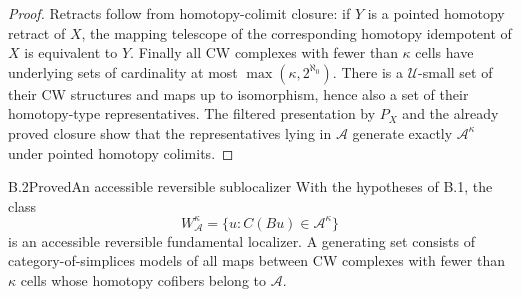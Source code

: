 \begin{proof}
Retracts follow from homotopy-colimit closure: if $Y$ is a pointed homotopy retract of $X$, the mapping telescope of the corresponding homotopy idempotent of $X$ is equivalent to $Y$. Finally all CW complexes with fewer than $\kappa$ cells have underlying sets of cardinality at most $\max(\kappa,2^{\aleph_0})$. There is a $\mathcal U$-small set of their CW structures and maps up to isomorphism, hence also a set of their homotopy-type representatives. The filtered presentation by $P_X$ and the already proved closure show that the representatives lying in $\mathcal A$ generate exactly $\mathcal A^\kappa$ under pointed homotopy colimits.
\end{proof}

\begin{claim}{B.2}{Proved}{An accessible reversible sublocalizer}\label{B2}
With the hypotheses of B.1, the class
\[
 W^\kappa_{\mathcal A}
   =\{u:C(Bu)\in\mathcal A^\kappa\}
\]
is an accessible reversible fundamental localizer. A generating set consists of category-of-simplices models of all maps between CW complexes with fewer than $\kappa$ cells whose homotopy cofibers belong to $\mathcal A$.
\end{claim}
